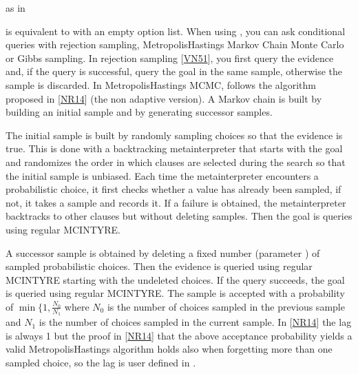 \documentclass[letterpaper,10pt,english]{sphinxmanual}
\begin{document}
\sphinxAtStartPar
as in

\begin{sphinxVerbatim}[commandchars=\\\{\}]
 \PYG{p}{[}
\end{sphinxVerbatim}

\sphinxAtStartPar
{} is equivalent to  with an empty option list.
When using , you can ask conditional queries with rejection sampling,
Metropolis\sphinxhyphen{}Hastings Markov Chain Monte Carlo or Gibbs sampling.
In rejection sampling {[}\hyperlink{cite.index:id54}{VN51}{]}, you first query the evidence and, if the query is successful, query the goal in the same sample, otherwise the sample is discarded.
In Metropolis\sphinxhyphen{}Hastings MCMC,  follows the algorithm proposed in {[}\hyperlink{cite.index:id55}{NR14}{]} (the non adaptive version).
A Markov chain is built by building an initial sample and by generating successor samples.

\sphinxAtStartPar
The initial sample is built by randomly sampling choices so that the evidence is true.
This is done with a backtracking meta\sphinxhyphen{}interpreter that starts with the goal and randomizes the order in which clauses are selected during the search so that the initial sample is unbiased.
Each time the meta\sphinxhyphen{}interpreter encounters a probabilistic choice, it first checks whether a value has already been sampled, if not, it takes a sample and records it.
If a failure is obtained, the meta\sphinxhyphen{}interpreter backtracks to other clauses but without deleting samples. Then the goal is queries using regular MCINTYRE.

\sphinxAtStartPar
A successor sample is obtained by deleting a fixed number (parameter ) of sampled probabilistic choices.
Then the evidence is queried using regular MCINTYRE starting with the undeleted choices.
If the query succeeds, the goal is queried using regular MCINTYRE.
The sample is accepted with a probability of \(\min\{1,\frac{N_0}{N_1}\) where \(N_0\) is the number of choices sampled in the previous sample and \(N_1\) is the number of choices sampled in the current sample.
In {[}\hyperlink{cite.index:id55}{NR14}{]} the lag is always 1 but the proof in {[}\hyperlink{cite.index:id55}{NR14}{]} that the above acceptance probability yields a valid Metropolis\sphinxhyphen{}Hastings algorithm holds also when forgetting more than one sampled choice, so the lag is user defined in .
\end{document}
